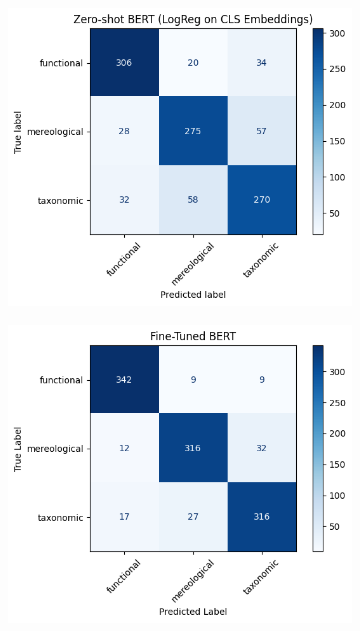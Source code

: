 \documentclass[stu,floatsintext]{apa7}
\begin{document}
\medskip
\begin{figure}[ht]
  \centering
  \caption{Confusion matrices for relation classification using pretrained BERT with logistic regression on CLS embeddings (left) and fine-tuned BERT (right).}
  \begin{subfigure}[b]{0.45\textwidth}
    \centering
    \includegraphics[width=\linewidth]{cf-pretrained.png}
    \label{fig:imageA}
  \end{subfigure}
  \hfill
  \begin{subfigure}[b]{0.45\textwidth}
    \centering
    \includegraphics[width=\linewidth]{cf-finetuned.png}
    \label{fig:imageB}
  \end{subfigure}
  \label{fig:sidebyside}
\end{figure}
\end{document}
